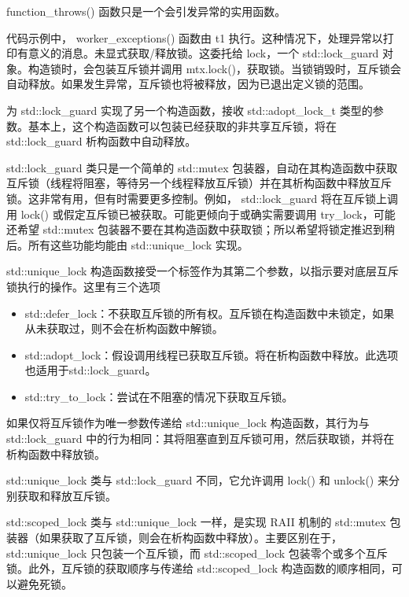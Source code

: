 function\_throws() 函数只是一个会引发异常的实用函数。

代码示例中， worker\_exceptions() 函数由 t1 执行。这种情况下，处理异常以打印有意义的消息。未显式获取/释放锁。这委托给 lock，一个 std::lock\_guard 对象。构造锁时，会包装互斥锁并调用 mtx.lock()，获取锁。当锁销毁时，互斥锁会自动释放。如果发生异常，互斥锁也将被释放，因为已退出定义锁的范围。

为 std::lock\_guard 实现了另一个构造函数，接收 std::adopt\_lock\_t 类型的参数。基本上，这个构造函数可以包装已经获取的非共享互斥锁，将在 std::lock\_guard 析构函数中自动释放。


std::lock\_guard 类只是一个简单的 std::mutex 包装器，自动在其构造函数中获取互斥锁（线程将阻塞，等待另一个线程释放互斥锁）并在其析构函数中释放互斥锁。这非常有用，但有时需要更多控制。例如， std::lock\_guard 将在互斥锁上调用 lock() 或假定互斥锁已被获取。可能更倾向于或确实需要调用 try\_lock，可能还希望 std::mutex 包装器不要在其构造函数中获取锁；所以希望将锁定推迟到稍后。所有这些功能均能由 std::unique\_lock 实现。

std::unique\_lock 构造函数接受一个标签作为其第二个参数，以指示要对底层互斥锁执行的操作。这里有三个选项

\begin{itemize}
\item
std::defer\_lock：不获取互斥锁的所有权。互斥锁在构造函数中未锁定，如果从未获取过，则不会在析构函数中解锁。

\item
std::adopt\_lock：假设调用线程已获取互斥锁。将在析构函数中释放。此选项也适用于std::lock\_guard。

\item
std::try\_to\_lock：尝试在不阻塞的情况下获取互斥锁。
\end{itemize}

如果仅将互斥锁作为唯一参数传递给 std::unique\_lock 构造函数，其行为与 std::lock\_guard 中的行为相同：其将阻塞直到互斥锁可用，然后获取锁，并将在析构函数中释放锁。

std::unique\_lock 类与 std::lock\_guard 不同，它允许调用 lock() 和 unlock() 来分别获取和释放互斥锁。


std::scoped\_lock 类与 std::unique\_lock 一样，是实现 RAII 机制的 std::mutex 包装器（如果获取了互斥锁，则会在析构函数中释放）。主要区别在于，std::unique\_lock 只包装一个互斥锁，而 std::scoped\_lock 包装零个或多个互斥锁。此外，互斥锁的获取顺序与传递给 std::scoped\_lock 构造函数的顺序相同，可以避免死锁。

